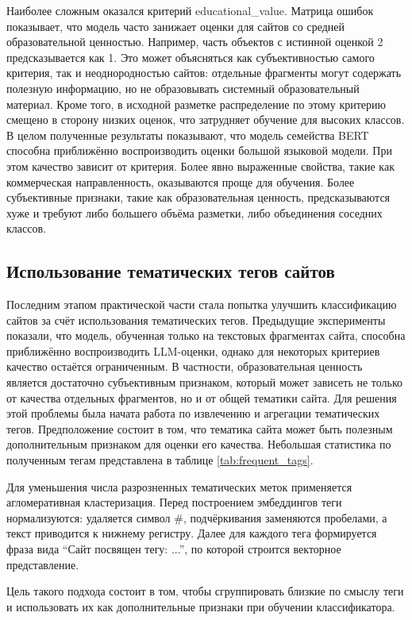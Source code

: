 \documentclass[oneside,senior,etd]{BYUPhys}
\begin{document}
Наиболее сложным оказался критерий educational\_value. 
Матрица ошибок показывает, что модель часто занижает оценки для сайтов со средней образовательной ценностью. 
Например, часть объектов с истинной оценкой 2 предсказывается как 1. 
Это может объясняться как субъективностью самого критерия, так и неоднородностью сайтов: отдельные фрагменты могут содержать полезную информацию, но не образовывать системный образовательный материал. 
Кроме того, в исходной разметке распределение по этому критерию смещено в сторону низких оценок, что затрудняет обучение для высоких классов.
В целом полученные результаты показывают, что модель семейства BERT способна приближённо воспроизводить оценки большой языковой модели. 
При этом качество зависит от критерия. Более явно выраженные свойства, такие как коммерческая направленность, оказываются проще для обучения. 
Более субъективные признаки, такие как образовательная ценность, предсказываются хуже и требуют либо большего объёма разметки, либо объединения соседних классов.

\subsection{Использование тематических тегов сайтов}

Последним этапом практической части стала попытка улучшить классификацию сайтов за счёт использования тематических тегов. 
Предыдущие эксперименты показали, что модель, обученная только на текстовых фрагментах сайта, способна приближённо воспроизводить LLM-оценки, однако для некоторых критериев качество остаётся ограниченным. 
В частности, образовательная ценность является достаточно субъективным признаком, который может зависеть не только от качества отдельных фрагментов, но и от общей тематики сайта.
Для решения этой проблемы была начата работа по извлечению и агрегации тематических тегов. 
Предположение состоит в том, что тематика сайта может быть полезным дополнительным признаком для оценки его качества. 
Небольшая статистика по полученным тегам представлена в таблице \ref{tab:frequent_tags}.

Для уменьшения числа разрозненных тематических меток применяется агломеративная кластеризация. 
Перед построением эмбеддингов теги нормализуются: удаляется символ \#, подчёркивания заменяются пробелами, 
а текст приводится к нижнему регистру. Далее для каждого тега формируется фраза вида ``Сайт посвящен тегу: ...'', 
по которой строится векторное представление.

Цель такого подхода состоит в том, чтобы сгруппировать близкие по смыслу теги и использовать их как дополнительные признаки при обучении классификатора. 
\end{document}
